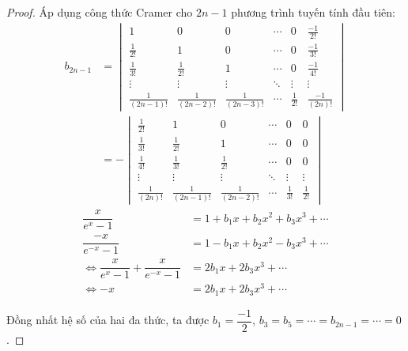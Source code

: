 \documentclass[class=nhvh-linear-algebra,crop=false]{standalone}
\begin{document}
\begin{proof}
	\par Áp dụng công thức Cramer cho $2n-1$ phương trình tuyến tính đầu tiên:
	\begin{align*}
		b_{2n-1} & =
		\begin{vmatrix}
			1                 & 0                 & 0                 & \cdots & 0            & \frac{-1}{2!}    \\
			\frac{1}{2!}      & 1                 & 0                 & \cdots & 0            & \frac{-1}{3!}    \\
			\frac{1}{3!}      & \frac{1}{2!}      & 1                 & \cdots & 0            & \frac{-1}{4!}    \\
			\vdots            & \vdots            & \vdots            & \ddots & \vdots       & \vdots           \\
			\frac{1}{(2n-1)!} & \frac{1}{(2n-2)!} & \frac{1}{(2n-3)!} & \cdots & \frac{1}{2!} & \frac{-1}{(2n)!}
		\end{vmatrix} \\
		         & = -
		\begin{vmatrix}
			\frac{1}{2!}    & 1                 & 0                 & \cdots & 0            & 0            \\
			\frac{1}{3!}    & \frac{1}{2!}      & 1                 & \cdots & 0            & 0            \\
			\frac{1}{4!}    & \frac{1}{3!}      & \frac{1}{2!}      & \cdots & 0            & 0            \\
			\vdots          & \vdots            & \vdots            & \ddots & \vdots       & \vdots       \\
			\frac{1}{(2n)!} & \frac{1}{(2n-1)!} & \frac{1}{(2n-2)!} & \cdots & \frac{1}{3!} & \frac{1}{2!}
		\end{vmatrix}
	\end{align*}
	\begin{align*}
		\dfrac{x}{e^{x}-1}                                             & = 1 + b_{1}x + b_{2}x^{2} + b_{3}x^{3} + \cdots \\
		\dfrac{-x}{e^{-x}-1}                                           & = 1 - b_{1}x + b_{2}x^{2} - b_{3}x^{3} + \cdots \\
		\Longleftrightarrow \dfrac{x}{e^{x} - 1} + \dfrac{x}{e^{-x}-1} & = 2b_{1}x + 2b_{3}x^{3} + \cdots                \\
		\Longleftrightarrow -x                                         & = 2b_{1}x + 2b_{3}x^{3} + \cdots
	\end{align*}
	\par Đồng nhất hệ số của hai đa thức, ta được $b_{1} = \dfrac{-1}{2}$, $b_{3} = b_{5} = \cdots = b_{2n-1} = \cdots = 0$.

\end{proof}
\end{document}
